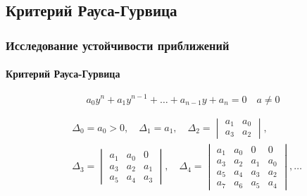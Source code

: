 \documentclass{beamer}
\numberwithin{equation}{section}
\begin{document}
    \subsection{Критерий Рауса-Гурвица}

    \begin{frame}
        \frametitle{Исследование устойчивости приближений}
        \framesubtitle{Критерий Рауса-Гурвица}

        \begin{equation}
            a_0 y^n + a_1 y^{n-1} + \dots + a_{n-1} y + a_n = 0 \quad a \neq 0
        \end{equation}
    
        \begin{align*}
            & \Delta_0 = a_0 > 0, \quad \Delta_1 = a_1, \quad \Delta_2 = 
            \begin{vmatrix}
                a_1 & a_0\\
                a_3 & a_2
            \end{vmatrix},\\
            & \Delta_3 = 
            \begin{vmatrix}
                a_1 & a_0 & 0\\
                a_3 & a_2 &a_1\\
                a_5 & a_4 &a_3
            \end{vmatrix}, \quad \Delta_4 =
            \begin{vmatrix}
                a_1 & a_0 & 0 & 0\\
                a_3 & a_2 & a_1 & a_0\\
                a_5 & a_4 & a_3 & a_2\\
                a_7 & a_6 & a_5 & a_4
            \end{vmatrix}, \dots
        \end{align*}
    \end{frame}
\end{document}
